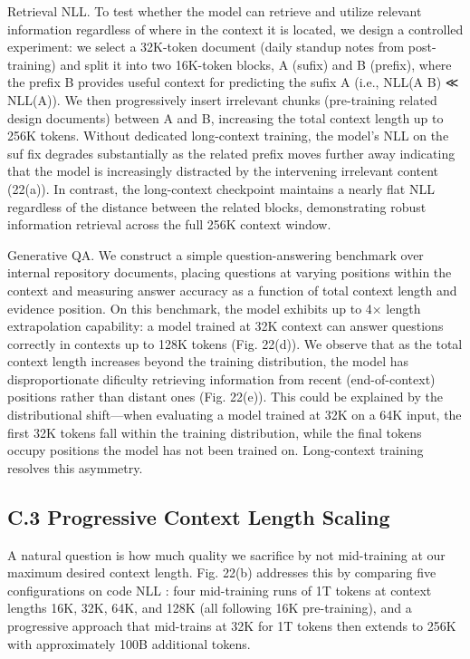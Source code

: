 \documentclass[
  10
]{article}
\begin{document}
Retrieval NLL. To test whether the model can retrieve and utilize
relevant information regardless of where in the context it is located,
we design a controlled experiment: we select a 32K-token document (daily
standup notes from post-training) and split it into two 16K-token
blocks, A (sufix) and B (prefix), where the prefix B provides useful
context for predicting the sufix A (i.e., NLL(A \textbar{} B) ≪ NLL(A)).
We then progressively insert irrelevant chunks (pre-training related
design documents) between A and B, increasing the total context length
up to 256K tokens. Without dedicated long-context training, the model's
NLL on the suf fix degrades substantially as the related prefix moves
further away indicating that the model is increasingly distracted by the
intervening irrelevant content (22(a)). In contrast, the long-context
checkpoint maintains a nearly flat NLL regardless of the distance
between the related blocks, demonstrating robust information retrieval
across the full 256K context window.

Generative QA. We construct a simple question-answering benchmark over
internal repository documents, placing questions at varying positions
within the context and measuring answer accuracy as a function of total
context length and evidence position. On this benchmark, the model
exhibits up to 4× length extrapolation capability: a model trained at
32K context can answer questions correctly in contexts up to 128K tokens
(Fig. 22(d)). We observe that as the total context length increases
beyond the training distribution, the model has disproportionate
dificulty retrieving information from recent (end-of-context) positions
rather than distant ones (Fig. 22(e)). This could be explained by the
distributional shift---when evaluating a model trained at 32K on a 64K
input, the first 32K tokens fall within the training distribution, while
the final tokens occupy positions the model has not been trained on.
Long-context training resolves this asymmetry.

\subsection{C.3 Progressive Context Length
Scaling}\label{c.3-progressive-context-length-scaling}

A natural question is how much quality we sacrifice by not mid-training
at our maximum desired context length. Fig. 22(b) addresses this by
comparing five configurations on code NLL : four mid-training runs of 1T
tokens at context lengths 16K, 32K, 64K, and 128K (all following 16K
pre-training), and a progressive approach that mid-trains at 32K for 1T
tokens then extends to 256K with approximately 100B additional tokens.
\end{document}
